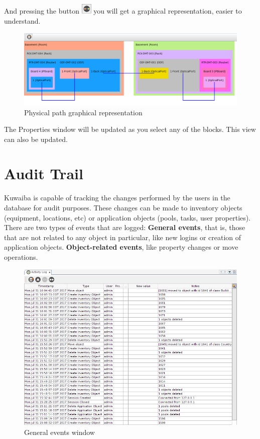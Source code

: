 \documentclass[a4paper]{article}
\begin{document}
			And pressing the button \includegraphics[width=0.5cm]{img/icon_physical_path_graphical.png} you will get a graphical representation, easier to understand.
			\begin{figure}[h!]
				\centering
				\includegraphics[width=1.1\linewidth]{img/l1_example_2_physical_path_view.png}
				\caption{Physical path graphical representation}
				\label{fig:l1_example_2_physical_path_view}
			\end{figure}
			The Properties window will be updated as you select any of the blocks. This view can also be updated.
			
	\clearpage
	\section{Audit Trail} \label{sec:audit_trail}
	Kuwaiba is capable of tracking the changes performed by the users in the database for audit purposes. These changes can be made to inventory objects (equipment, locations, etc) or application objects (pools, tasks, user properties). There are two types of events that are logged: \textbf{General events}, that is, those that are not related to any object in particular, like new logins or creation of application objects. \textbf{Object-related events}, like property changes or move operations.
	\begin{figure}[h!]
		\centering
		\includegraphics[width=\linewidth]{img/audit_trail_general_events.png}
		\caption{General events window}
		\label{fig:audit_trail_general_events}
	\end{figure}
	
\end{document}
